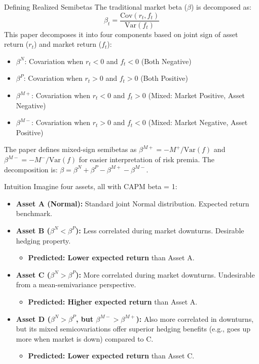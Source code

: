 \documentclass[10pt]{beamer}
\begin{document}
\begin{frame}{Defining Realized Semibetas}
  The traditional market beta ($\beta$) is decomposed as:
  $$
 \beta_t = \frac{\text{Cov}(r_t, f_t)}{\text{Var}(f_t)} 
$$
  This paper decomposes it into four components based on joint sign of asset return ($r_t$) and market return ($f_t$):
  \begin{itemize}
    \item $\beta^N$: Covariation when $r_t < 0$ and $f_t < 0$ (Both Negative)
    \item $\beta^P$: Covariation when $r_t > 0$ and $f_t > 0$ (Both Positive)
    \item $\beta^{M+}$: Covariation when $r_t < 0$ and $f_t > 0$ (Mixed: Market Positive, Asset Negative)
    \item $\beta^{M-}$: Covariation when $r_t > 0$ and $f_t < 0$ (Mixed: Market Negative, Asset Positive)
  \end{itemize}

  The paper defines mixed-sign semibetas as $\beta^{M+} = -M^+/\text{Var}(f)$ and $\beta^{M-} = -M^-/\text{Var}(f)$ for easier interpretation of risk premia.
  The decomposition is: $\beta = \beta^N + \beta^P - \beta^{M+} - \beta^{M-}$.
\end{frame}

\begin{frame}{Intuition}
  Imagine four assets, all with CAPM beta = 1:
  \begin{itemize}
    \item \textbf{Asset A (Normal):} Standard joint Normal distribution. Expected return benchmark.
    \item \textbf{Asset B ($\beta^N < \beta^P$):} Less correlated during market downturns. Desirable hedging property.
    \begin{itemize}
        \item \textbf{Predicted: Lower expected return} than Asset A.
    \end{itemize}
    \item \textbf{Asset C ($\beta^N > \beta^P$):} More correlated during market downturns. Undesirable from a mean-semivariance perspective.
    \begin{itemize}
        \item \textbf{Predicted: Higher expected return} than Asset A.
    \end{itemize}
    \item \textbf{Asset D ($\beta^N > \beta^P$, but $\beta^{M-} > \beta^{M+}$):} Also more correlated in downturns, but its mixed semicovariations offer superior hedging benefits (e.g., goes up more when market is down) compared to C.
    \begin{itemize}
        \item \textbf{Predicted: Lower expected return} than Asset C.
    \end{itemize}
  \end{itemize}
\end{frame}
\end{document}
